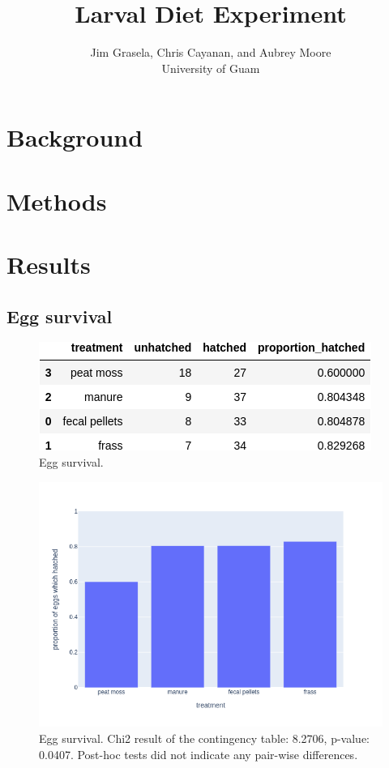 \documentclass[12pt,letterpaper,english,bibliography=totocnumbered, abstract=on]{scrartcl}
\begin{document}
\titlehead{TECHNICAL REPORT}

\title{Larval Diet Experiment}

\author{Jim Grasela, Chris Cayanan, and Aubrey Moore\\University of Guam}

\maketitle
\newpage
\tableofcontents

\pagebreak

\section{Background}

\section{Methods}

\newpage
\section{Results}

\subsection{Egg survival}

\begin{figure}[H]
	\centering
	\includegraphics[width=0.6\linewidth]{egg_survival_table.png}
	\caption{Egg survival.}
	\label{fig:eggsurvivaltable}
\end{figure}

\begin{figure}[H]
	\centering
	\includegraphics[width=0.6\linewidth]{egg_survival_plot}
	\caption{Egg survival. Chi2 result of the contingency table: 8.2706, p-value: 0.0407.
	Post-hoc tests did not indicate any pair-wise differences.}
	\label{fig:eggsurvivalplot}
\end{figure}
\end{document}
